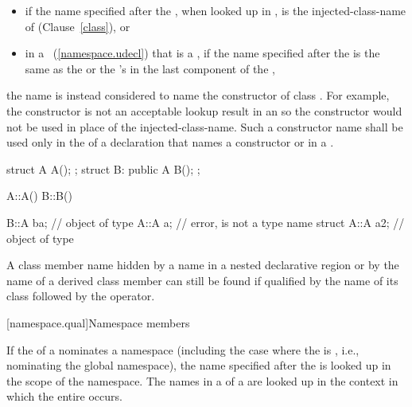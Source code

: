 \begin{itemize}
\item if the name specified after the ,
when looked up in , is the injected-class-name of  (Clause~\ref{class}), or
\item
in a ~(\ref{namespace.udecl}) that is a ,
if the name specified after the  is the same as the
 or the 's
 in the last component of the ,
\end{itemize}
the name is instead considered to name the
constructor of class . \enternote For example, the constructor
is not an acceptable lookup result in an
 so the constructor would not be
used in place of the injected-class-name. \exitnote Such a constructor
name shall be used only in the  of a declaration
that names a constructor or in a . \enterexample

\begin{codeblock}
struct A { A(); };
struct B: public A { B(); };

A::A() { }
B::B() { }

B::A ba;            // object of type 
A::A a;             // error,  is not a type name
struct A::A a2;     // object of type 
\end{codeblock}
\exitexample 

\pnum
A class member name hidden by a name in a nested declarative region or
by the name of a derived class member can still be found if qualified by
the name of its class followed by the \tcode{::} operator.

[namespace.qual]{Namespace members}

\pnum
{}%
If the  of a 
nominates a namespace (including the case where the
 is \tcode{::}, i.e., nominating
the global namespace), the name specified after the
 is looked up in the scope of the
namespace.
The names in a  of a
 are looked up in the context in which the
entire  occurs.

